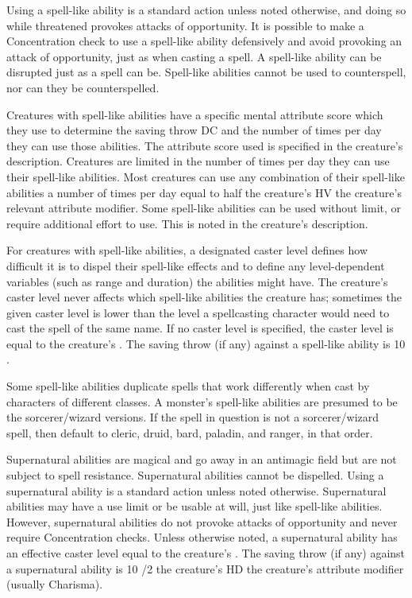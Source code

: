 {Using a spell-like ability is a standard action unless noted otherwise, and doing so while threatened provokes attacks of opportunity. It is possible to make a Concentration check to use a spell-like ability defensively and avoid provoking an attack of opportunity, just as when casting a spell. A spell-like ability can be disrupted just as a spell can be. Spell-like abilities cannot be used to counterspell, nor can they be counterspelled.

Creatures with spell-like abilities have a specific mental attribute score which they use to determine the saving throw DC and the number of times per day they can use those abilities. The attribute score used is specified in the creature's description. Creatures are limited in the number of times per day they can use their spell-like abilities. Most creatures can use any combination of their spell-like abilities a number of times per day equal to half the creature's HV \add the creature's relevant attribute modifier. Some spell-like abilities can be used without limit, or require additional effort to use. This is noted in the creature's description.

For creatures with spell-like abilities, a designated caster level defines how difficult it is to dispel their spell-like effects and to define any level-dependent variables (such as range and duration) the abilities might have. The creature's caster level never affects which spell-like abilities the creature has; sometimes the given caster level is lower than the level a spellcasting character would need to cast the spell of the same name. If no caster level is specified, the caster level is equal to the creature's . The saving throw (if any) against a spell-like ability is 10 \add {} \add {}.

Some spell-like abilities duplicate spells that work differently when cast by characters of different classes. A monster's spell-like abilities are presumed to be the sorcerer/wizard versions. If the spell in question is not a sorcerer/wizard spell, then default to cleric, druid, bard, paladin, and ranger, in that order.

 Supernatural abilities are magical and go away in an antimagic field but are not subject to spell resistance. Supernatural abilities cannot be dispelled. Using a supernatural ability is a standard action unless noted otherwise. Supernatural abilities may have a use limit or be usable at will, just like spell-like abilities. However, supernatural abilities do not provoke attacks of opportunity and never require Concentration checks. Unless otherwise noted, a supernatural ability has an effective caster level equal to the creature's . The saving throw (if any) against a supernatural ability is 10 /2 the creature's HD \add the creature's attribute modifier (usually Charisma).

}
